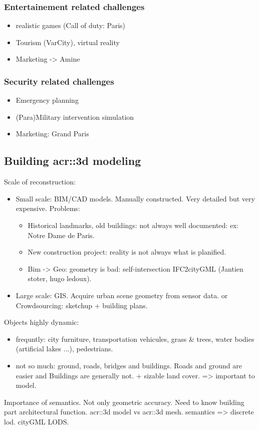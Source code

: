        \subsubsection{Entertainement related challenges}
        \begin{itemize}
            \item realistic games (Call of duty: Paris)
            \item Tourism (VarCity), virtual reality
            \item Marketing -> Amine
        \end{itemize}
        \subsubsection{Security related challenges}
        \begin{itemize}
            \item Emergency planning
            \item (Para)Military intervention simulation
            \item Marketing: Grand Paris
        \end{itemize}
    \subsection{Building \gls{acr::3d} modeling}
        \label{subsec::introduction::urban_3d_reconstruction::building_3d_modeling}
        Scale of reconstruction:
        \begin{itemize}
            \item Small scale: BIM/CAD models. Manually constructed. Very detailed but very expensive. Problems:
            \begin{itemize}
                \item Historical landmarks, old buildings: not always well documented: ex: Notre Dame de Paris.
                \item New construction project: reality is not always what is planified.
                \item Bim -> Geo: geometry is bad: self-intersection IFC2cityGML (Jantien stoter, hugo ledoux).
            \end{itemize}
            \item Large scale: GIS. Acquire urban scene geometry from sensor data. or Crowdsourcing: sketchup + building plans.
        \end{itemize}
        Objects highly dynamic:
        \begin{itemize}
            \item frequntly: city furniture, transportation vehicules, grass \& trees, water bodies (artificial lakes ...), pedestrians.
            \item not so much: ground, roads, bridges and buildings. Roads and ground are easier and Buildings are generally not. + sizable land cover. => important to model.\\
        \end{itemize}
        Importance of semantics. Not only geometric accuracy. Need to know building part architectural function. \gls{acr::3d} model vs \gls{acr::3d} mesh.
        semantics => discrete lod. cityGML LODS.\\
